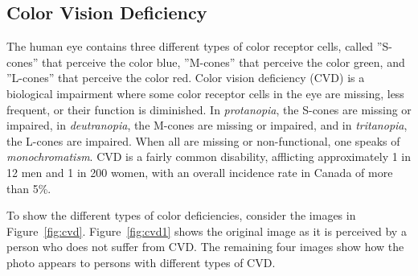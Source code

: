 \subsection*{Color Vision Deficiency}

The human eye contains three different types of color receptor cells, called ''S-cones'' that perceive the color blue, ''M-cones'' that perceive the color green, and ''L-cones'' that perceive the color red. Color vision deficiency (CVD) is a biological impairment where some color receptor cells in the eye are missing, less frequent, or their function is diminished. In \emph{protanopia}, the S-cones are missing or impaired, in \emph{deutranopia}, the M-cones are missing or impaired, and in \emph{tritanopia}, the L-cones are impaired. When all are missing or non-functional, one speaks of \emph{monochromatism}. CVD is a fairly common disability, afflicting approximately 1 in 12 men and 1 in 200 women, with an overall incidence rate in Canada of more than 5\%.

To show the different types of color deficiencies, consider the images in Figure~\ref{fig:cvd}. Figure~\ref{fig:cvd1} shows the original image as it is perceived by a person who does not suffer from CVD. The remaining four images show how the photo appears to persons with different types of CVD.


